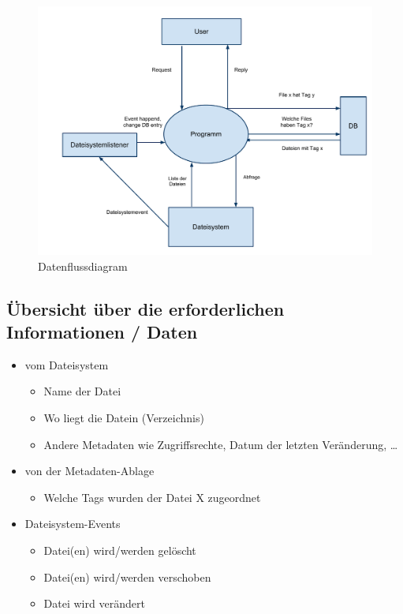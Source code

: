 \documentclass[10pt,paper=a4,final]{scrartcl}
\begin{document}
\begin{itemize}
\begin{figure}[h!]
    \includegraphics[width = \textwidth]{datenfluss.pdf}
    \caption{Datenflussdiagram}
  \end{figure}
\end{itemize}
\subsection{\"Ubersicht \"uber die erforderlichen Informationen / Daten}
\begin{itemize}
  \item vom Dateisystem
    \begin{itemize}
      \item Name der Datei
      \item Wo liegt die Datein (Verzeichnis)
      \item Andere Metadaten wie Zugriffsrechte, Datum der letzten Ver\"anderung, \ldots
    \end{itemize}
  \item von der Metadaten-Ablage
    \begin{itemize}
      \item Welche Tags wurden der Datei X zugeordnet
    \end{itemize}
  \item Dateisystem-Events
    \begin{itemize}
      \item Datei(en) wird/werden gel\"oscht
      \item Datei(en) wird/werden verschoben
      \item Datei wird ver\"andert
    \end{itemize}
\end{itemize}
\end{document}
